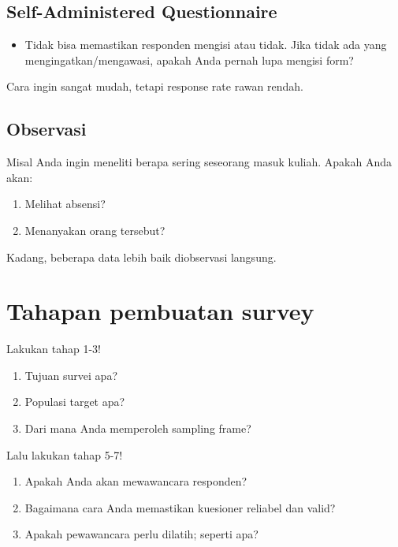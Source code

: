 \documentclass[
  letterpaper,
  DIV=11,
  numbers=noendperiod]{scrreprt}
\providecommand{\tightlist}{%
  \setlength{\itemsep}{0pt}\setlength{\parskip}{0pt}}\usepackage{longtable,booktabs,array}
\begin{document}
\hypertarget{self-administered-questionnaire}{%
\subsection{Self-Administered
Questionnaire}\label{self-administered-questionnaire}}

\begin{itemize}
\tightlist
\item
  Tidak bisa memastikan responden mengisi atau tidak. Jika tidak ada
  yang mengingatkan/mengawasi, apakah Anda pernah lupa mengisi form?
\end{itemize}

Cara ingin sangat mudah, tetapi response rate rawan rendah.

\hypertarget{observasi}{%
\subsection{Observasi}\label{observasi}}

Misal Anda ingin meneliti berapa sering seseorang masuk kuliah. Apakah
Anda akan:

\begin{enumerate}
\def\labelenumi{\arabic{enumi}.}
\tightlist
\item
  Melihat absensi?
\item
  Menanyakan orang tersebut?
\end{enumerate}

Kadang, beberapa data lebih baik diobservasi langsung.

\hypertarget{tahapan-pembuatan-survey}{%
\section{Tahapan pembuatan survey}\label{tahapan-pembuatan-survey}}

Lakukan tahap 1-3!

\begin{enumerate}
\def\labelenumi{\arabic{enumi}.}
\tightlist
\item
  Tujuan survei apa?
\item
  Populasi target apa?
\item
  Dari mana Anda memperoleh sampling frame?
\end{enumerate}

Lalu lakukan tahap 5-7!

\begin{enumerate}
\def\labelenumi{\arabic{enumi}.}
\setcounter{enumi}{4}
\tightlist
\item
  Apakah Anda akan mewawancara responden?
\item
  Bagaimana cara Anda memastikan kuesioner reliabel dan valid?
\item
  Apakah pewawancara perlu dilatih; seperti apa?
\end{enumerate}
\end{document}
